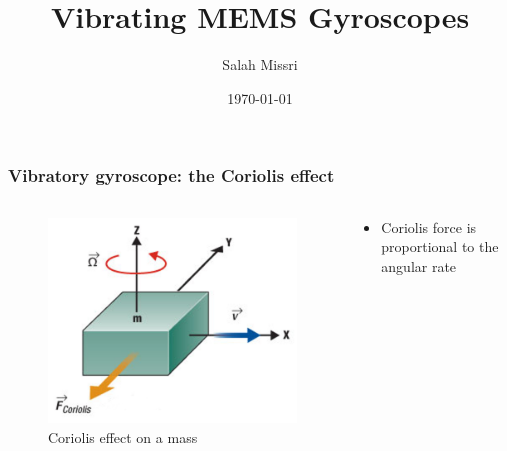 \documentclass[10pt]{beamer}
\title{Vibrating {\rmfamily\textsc{MEMS}} Gyroscopes}
\date{\today}
\author{Salah Missri}
\institute{EPFL}
\begin{document}
\maketitle



\begin{frame}
\frametitle{Vibratory gyroscope: the Coriolis effect}
\begin{columns}
    \begin{column}{.48\textwidth}
        \begin{figure}
            \centering
            \includegraphics[width=1.\linewidth]{coriolis1.png}
            \caption{Coriolis effect on a mass\cite{MEMSblog}}
        \end{figure}
    \end{column}
    \hfill
    \begin{column}{.60\textwidth}
        \begin{itemize}
            \item Coriolis force is proportional to the angular rate
            \begin{equation*}

\end{equation*}
\end{itemize}
\end{column}
\end{columns}
\end{frame}
\end{document}
